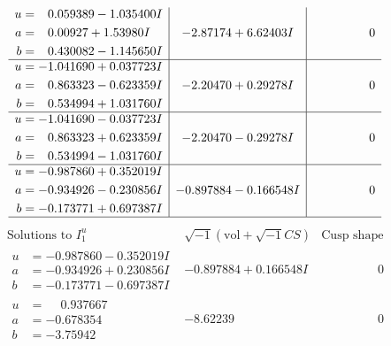 \documentclass[1p]{elsarticle_modified}
\theoremstyle{definition}
\newcommand{\I}{\sqrt{-1}}
\begin{document}
$$\begin{array}{c|c|c}
\begin{aligned}
u &= \phantom{-}0.059389 - 1.035400 I \\
a &= \phantom{-}0.00927 + 1.53980 I \\
b &= \phantom{-}0.430082 - 1.145650 I\end{aligned}
 & -2.87174 + 6.62403 I & \phantom{-0.000000 } 0 \\ \hline\begin{aligned}
u &= -1.041690 + 0.037723 I \\
a &= \phantom{-}0.863323 - 0.623359 I \\
b &= \phantom{-}0.534994 + 1.031760 I\end{aligned}
 & -2.20470 + 0.29278 I & \phantom{-0.000000 } 0 \\ \hline\begin{aligned}
u &= -1.041690 - 0.037723 I \\
a &= \phantom{-}0.863323 + 0.623359 I \\
b &= \phantom{-}0.534994 - 1.031760 I\end{aligned}
 & -2.20470 - 0.29278 I & \phantom{-0.000000 } 0 \\ \hline\begin{aligned}
u &= -0.987860 + 0.352019 I \\
a &= -0.934926 - 0.230856 I \\
b &= -0.173771 + 0.697387 I\end{aligned}
 & -0.897884 - 0.166548 I & \phantom{-0.000000 } 0\\
 \hline 
 \end{array}$$\newpage$$\begin{array}{c|c|c}  
\text{Solutions to }I^u_{1}& \I (\text{vol} + \sqrt{-1}CS) & \text{Cusp shape}\\
 \hline 
\begin{aligned}
u &= -0.987860 - 0.352019 I \\
a &= -0.934926 + 0.230856 I \\
b &= -0.173771 - 0.697387 I\end{aligned}
 & -0.897884 + 0.166548 I & \phantom{-0.000000 } 0 \\ \hline\begin{aligned}
u &= \phantom{-}0.937667\phantom{ +0.000000I} \\
a &= -0.678354\phantom{ +0.000000I} \\
b &= -3.75942\phantom{ +0.000000I}\end{aligned}
 & -8.62239\phantom{ +0.000000I} & \phantom{-0.000000 } 0 \\ \hline\begin{aligned}

\end{aligned}
\end{array}$$
\end{document}
